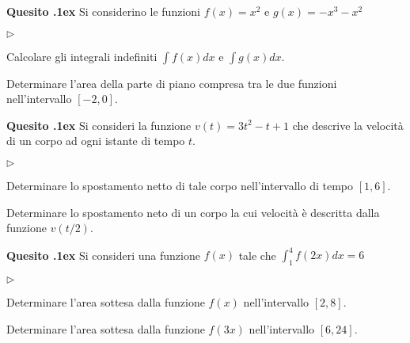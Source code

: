 \documentclass[11pt,twoside,a4paper]{article}
\newcommand{\mylabel}[1]{#1\hfill}
\renewenvironment{itemize}
  {\begin{list}{$\triangleright$}{%
   \setlength{\parskip}{0mm}
   \setlength{\topsep}{.4\baselineskip}
   \setlength{\rightmargin}{0mm}
   \setlength{\listparindent}{0mm}
   \setlength{\itemindent}{0mm}
   \setlength{\labelwidth}{2ex}
   \setlength{\itemsep}{.4\baselineskip}
   \setlength{\parsep}{0mm}
   \setlength{\partopsep}{0mm}
   \setlength{\labelsep}{1ex}
   \setlength{\leftmargin}{\labelwidth+\labelsep}
   \let\makelabel\mylabel}}{%
   \end{list}\vspace*{-1.3mm}}
\newcounter{quesito}
\newenvironment{question}{\bigskip\addtocounter{quesito}{1}\bigskip\bigskip\par\textbf{Quesito \thequesito.\kern1ex}}{\vspace{\parskip}}
\begin{document}
\begin{question}
Si considerino le funzioni $f(x) = x^2$ e $g(x) = -x^3 - x^2$
\begin{itemize}
\item[1.] Calcolare gli integrali indefiniti $\displaystyle \int f(x) dx$ e $\displaystyle \int g(x) dx$.
\item[2.] Determinare l'area della parte di piano compresa tra le due funzioni nell'intervallo $[-2, 0]$.
\end{itemize}
\end{question}
\begin{question}
Si consideri la funzione $v(t) = 3 t^2 - t +1$ che descrive la velocit\`a di un corpo ad ogni istante di tempo $t$.
\begin{itemize}
\item[1.] Determinare lo spostamento netto di tale corpo nell'intervallo di tempo $[1, 6]$.
\item[2.] Determinare lo spostamento neto di un corpo la cui velocit\`a \`e descritta dalla funzione $v(t/2)$.
\end{itemize}
\end{question}
\begin{question}
Si consideri una funzione $f(x)$ tale che $\displaystyle \int_1^4 f(2x) dx = 6$
\begin{itemize}
\item[1.] Determinare l'area sottesa dalla funzione $f(x)$ nell'intervallo $[2,8]$.
\item[2.] Determinare l'area sottesa dalla funzione $f(3x)$ nell'intervallo $[6,24]$.
\end{itemize}
\end{question}
\end{document}
